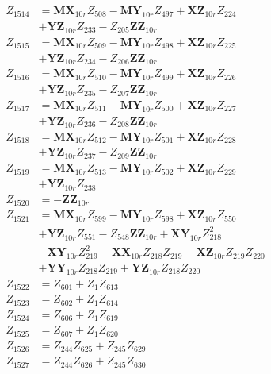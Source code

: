 \begin{multicols}{2}
\begin{align}
Z_{1514} &= \mathbf{MX}_{10r}Z_{508} - \mathbf{MY}_{10r}Z_{497} + \mathbf{XZ}_{10r}Z_{224}  \nonumber \\
&+ \mathbf{YZ}_{10r}Z_{233} - Z_{205}\mathbf{ZZ}_{10r} \nonumber \\
Z_{1515} &= \mathbf{MX}_{10r}Z_{509} - \mathbf{MY}_{10r}Z_{498} + \mathbf{XZ}_{10r}Z_{225}  \nonumber \\
&+ \mathbf{YZ}_{10r}Z_{234} - Z_{206}\mathbf{ZZ}_{10r} \nonumber \\
Z_{1516} &= \mathbf{MX}_{10r}Z_{510} - \mathbf{MY}_{10r}Z_{499} + \mathbf{XZ}_{10r}Z_{226}  \nonumber \\
&+ \mathbf{YZ}_{10r}Z_{235} - Z_{207}\mathbf{ZZ}_{10r} \nonumber \\
Z_{1517} &= \mathbf{MX}_{10r}Z_{511} - \mathbf{MY}_{10r}Z_{500} + \mathbf{XZ}_{10r}Z_{227}  \nonumber \\
&+ \mathbf{YZ}_{10r}Z_{236} - Z_{208}\mathbf{ZZ}_{10r} \nonumber \\
Z_{1518} &= \mathbf{MX}_{10r}Z_{512} - \mathbf{MY}_{10r}Z_{501} + \mathbf{XZ}_{10r}Z_{228}  \nonumber \\
&+ \mathbf{YZ}_{10r}Z_{237} - Z_{209}\mathbf{ZZ}_{10r} \nonumber \\
Z_{1519} &= \mathbf{MX}_{10r}Z_{513} - \mathbf{MY}_{10r}Z_{502} + \mathbf{XZ}_{10r}Z_{229}  \nonumber \\
&+ \mathbf{YZ}_{10r}Z_{238} \nonumber \\
Z_{1520} &= -\mathbf{ZZ}_{10r} \nonumber \\
Z_{1521} &= \mathbf{MX}_{10r}Z_{599} - \mathbf{MY}_{10r}Z_{598} + \mathbf{XZ}_{10r}Z_{550}  \nonumber \\
&+ \mathbf{YZ}_{10r}Z_{551} - Z_{548}\mathbf{ZZ}_{10r} + \mathbf{XY}_{10r}Z_{218}^2  \nonumber \\
&- \mathbf{XY}_{10r}Z_{219}^2 - \mathbf{XX}_{10r}Z_{218}Z_{219} - \mathbf{XZ}_{10r}Z_{219}Z_{220}  \nonumber \\
&+ \mathbf{YY}_{10r}Z_{218}Z_{219} + \mathbf{YZ}_{10r}Z_{218}Z_{220} \nonumber \\
Z_{1522} &= Z_{601} + Z_{1}Z_{613} \nonumber \\
Z_{1523} &= Z_{602} + Z_{1}Z_{614} \nonumber \\
Z_{1524} &= Z_{606} + Z_{1}Z_{619} \nonumber \\
Z_{1525} &= Z_{607} + Z_{1}Z_{620} \nonumber \\
Z_{1526} &= Z_{244}Z_{625} + Z_{245}Z_{629} \nonumber \\
Z_{1527} &= Z_{244}Z_{626} + Z_{245}Z_{630} \nonumber \\

\end{align}
\end{multicols}
